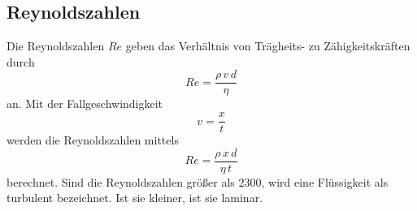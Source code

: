 \subsection{Reynoldszahlen}
Die Reynoldszahlen $Re$ geben das Verhältnis von Trägheits- zu
Zähigkeitskräften durch
\begin{equation*}
    Re = \frac{\rho \, v \, d}{\eta}
\end{equation*}
an.
Mit der Fallgeschwindigkeit
\begin{equation}
    v = \frac{x}{t}
    \label{eqn:v}
\end{equation}
werden die Reynoldszahlen mittels
\begin{equation}
    Re = \frac{\rho \, x \, d}{\eta \, t}
    \label{eqn:Re}
\end{equation}
berechnet. Sind die Reynoldszahlen größer als 2300, wird eine Flüssigkeit als turbulent bezeichnet. Ist sie kleiner, ist sie laminar. 
